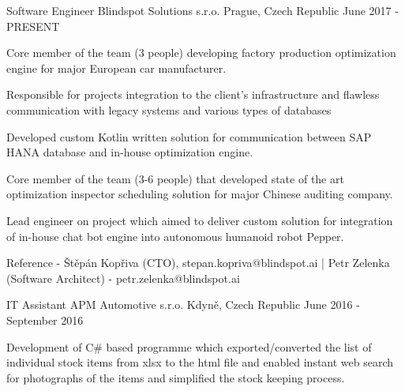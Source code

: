 


\begin{cventries}
		
		
	\cventry
	{Software Engineer} %
	{Blindspot Solutions s.r.o.} %
	{Prague, Czech Republic} %
	{June 2017 - PRESENT} %
	{ %
		\begin{cvitems}
			\item {Core member of the team (3 people) developing factory production optimization engine for major European car manufacturer.}
			\item {Responsible for projects integration to the client's infrastructure and flawless communication with legacy systems and various types of databases}
			\item {Developed custom Kotlin written solution for communication between SAP HANA database and in-house optimization engine. }
			\item {Core member of the team (3-6 people) that developed state of the art optimization inspector scheduling solution for major Chinese auditing company.}
			\item {Lead engineer on project which aimed to deliver custom solution for integration of in-house chat bot engine into autonomous humanoid robot Pepper. }
			\item {Reference - Štěpán Kopřiva (CTO), stepan.kopriva@blindspot.ai | Petr Zelenka (Software Architect) - petr.zelenka@blindspot.ai }
		\end{cvitems}
	}
	
		
	\cventry
	{IT Assistant} %
	{APM Automotive s.r.o.} %
	{Kdyně, Czech Republic} %
	{June 2016 - September 2016} %
	{ %
		\begin{cvitems}
			\item {Development of C\# based programme which exported/converted the list of individual stock items from xlsx to the html file and enabled instant web search for photographs of the items and simplified the stock keeping process.}
		\end{cvitems}
	}
			
\end{cventries}